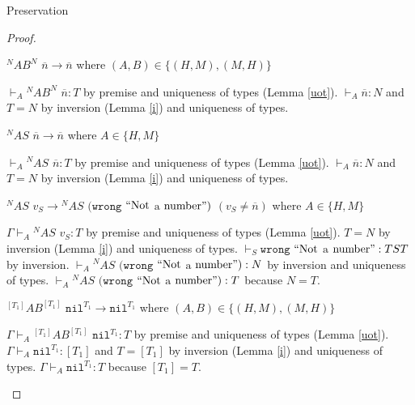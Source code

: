 \begin{theorem}{Preservation}
\begin{proof}

\begin{case}
$^{N}AB^{N}$ $\overline{n}\rightarrow\overline{n}$ where $(A,B)\in\lbrace(H,M),(M,H)\rbrace$

$\vdash_{A}{^{N}A}B^{N}$ $\overline{n}:T$ by premise and uniqueness of types (Lemma \ref{uot}).  $\vdash_{A}\overline{n}:N$ and $T=N$ by inversion (Lemma \ref{i}) and uniqueness of types.
\end{case}


\begin{case}
$^{N}AS$ $\overline{n}\rightarrow\overline{n}$ where $A\in\lbrace H,M\rbrace$

$\vdash_{A}{^{N}A}S$ $\overline{n}:T$ by premise and uniqueness of types (Lemma \ref{uot}).  $\vdash_{A}\overline{n}:N$ and $T=N$ by inversion (Lemma \ref{i}) and uniqueness of types.
\end{case}


\begin{case}
$^{N}AS$ $v_{S}\rightarrow{^{N}A}S$ $(\mathtt{wrong}$ $\mathrm{``Not}$ $\mathrm{a}$ $\mathrm{number"})$ $(v_{S}\neq\overline{n})$ where $A\in\lbrace H,M\rbrace$

$\Gamma\vdash_{A}{^{N}AS}$ $v_{S}:T$ by premise and uniqueness of types (Lemma \ref{uot}).  $T=N$ by inversion (Lemma \ref{i}) and uniqueness of types.  $\vdash_{S}\mathtt{wrong}$ $\mathrm{``Not}$ $\mathrm{a}$ $\mathrm{number"}:TST$ by inversion.  $\vdash_{A}{^{N}A}S$ $(\mathtt{wrong}$ $\mathrm{``Not}$ $\mathrm{a}$ $\mathrm{number"}):N$ by inversion and uniqueness of types.  $\vdash_{A}{^{N}A}S$ $(\mathtt{wrong}$ $\mathrm{``Not}$ $\mathrm{a}$ $\mathrm{number"}):T$ because $N=T$.
\end{case}


\begin{case}
$^{[T_{1}]}AB^{[T_{1}]}$ $\mathtt{nil}^{T_{1}}\rightarrow\mathtt{nil}^{T_{1}}$ where $(A,B)\in\lbrace(H,M),(M,H)\rbrace$

$\Gamma\vdash_{A}{^{[T_{1}]}A}B^{[T_{1}]}$ $\mathtt{nil}^{T_{1}}:T$ by premise and uniqueness of types (Lemma \ref{uot}).  $\Gamma\vdash_{A}\mathtt{nil}^{T_{1}}:[T_{1}]$ and $T=[T_{1}]$ by inversion (Lemma \ref{i}) and uniqueness of types.  $\Gamma\vdash_{A}\mathtt{nil}^{T_{1}}:T$ because $[T_{1}]=T$.
\end{case}



\end{proof}
\end{theorem}
